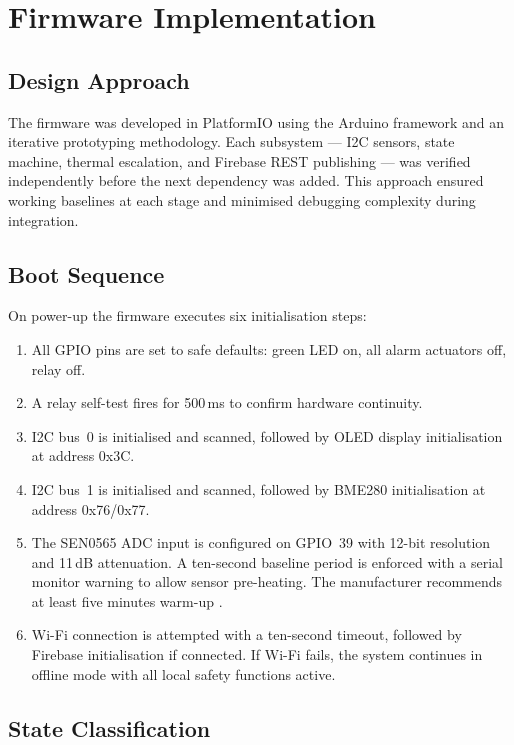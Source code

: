 \documentclass[a4paper,10pt,conference,onecolumn]{IEEEtran}
\begin{document}
\section{Firmware Implementation}
\label{sec:firmware}

\subsection{Design Approach}

The firmware was developed in PlatformIO using the Arduino framework and an
iterative prototyping methodology. Each subsystem --- I2C sensors, state
machine, thermal escalation, and Firebase REST publishing --- was verified
independently before the next dependency was added. This approach ensured
working baselines at each stage and minimised debugging complexity during
integration.

\subsection{Boot Sequence}

On power-up the firmware executes six initialisation steps:
\begin{enumerate}
  \item All GPIO pins are set to safe defaults: green LED on, all alarm
        actuators off, relay off.
  \item A relay self-test fires for 500\,ms to confirm hardware continuity.
  \item I2C bus~0 is initialised and scanned, followed by OLED display
        initialisation at address 0x3C.
  \item I2C bus~1 is initialised and scanned, followed by BME280
        initialisation at address 0x76/0x77.
  \item The SEN0565 ADC input is configured on GPIO~39 with 12-bit resolution
        and 11\,dB attenuation. A ten-second baseline period is enforced with
        a serial monitor warning to allow sensor pre-heating. The manufacturer
        recommends at least five minutes warm-up \cite{sen0565warmup}.
  \item Wi-Fi connection is attempted with a ten-second timeout, followed by
        Firebase initialisation if connected. If Wi-Fi fails, the system
        continues in offline mode with all local safety functions active.
\end{enumerate}

\subsection{State Classification}
\end{document}
